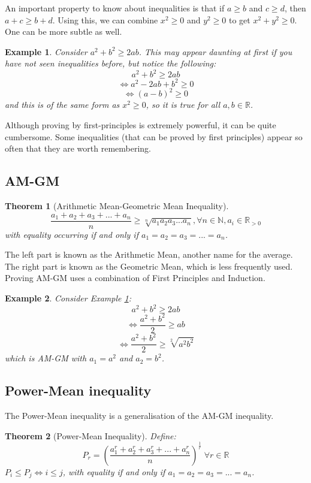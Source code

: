 \documentclass[a4paper,12pt]{article}
\newtheorem{example}{Example}[section]
\newtheorem{theorem}{Theorem}[section]
\begin{document}
An important property to know about inequalities is that if $a \geq b$ and $c \geq d$, then $a + c \geq b + d$. Using this, we can combine $x^2 \geq 0$ and $y^2 \geq 0$ to get $x^2 + y^2 \geq 0$. One can be more subtle as well. 

\begin{example}
    \label{basicfirstprinc}
    Consider $a^2 + b^2 \geq 2ab$. This may appear daunting at first if you have not seen inequalities before, but notice the following:
    $$a^2 + b^2 \geq 2ab$$
    $$\iff a^2 - 2ab + b^2 \geq 0$$
    $$\iff (a - b)^2 \geq 0$$
    and this is of the same form as $x^2 \geq 0$, so it is true for all $a, b \in \mathbb{R}$. \\
\end{example}

Although proving by first-principles is extremely powerful, it can be quite cumbersome. Some inequalities (that can be proved by first principles) appear so often that they are worth remembering.

\subsection{AM-GM}
\begin{theorem}[Arithmetic Mean-Geometric Mean Inequality]
$$\frac{a_1 + a_2 + a_3 + ... + a_n}{n} \geq \sqrt[n]{a_1a_2a_3...a_n}, \forall n \in \mathbb{N}, a_i \in \mathbb{R}_{> 0}$$
with equality occurring if and only if $a_1 = a_2 = a_3 = ... = a_n$.\\
\end{theorem}

The left part is known as the Arithmetic Mean, another name for the average. The right part is known as the Geometric Mean, which is less frequently used. Proving AM-GM uses a combination of First Principles and Induction.

\begin{example}
    Consider Example \ref{basicfirstprinc}:
    $$a^2 + b^2 \geq 2ab$$
$$\iff \frac{a^2 + b^2}{2} \geq ab$$
$$\iff \frac{a^2 + b^2}{2} \geq \sqrt[2]{a^2b^2}$$
which is AM-GM with $a_1 = a^2$ and $a_2 = b^2$.
\end{example}

\subsection{Power-Mean inequality}
The Power-Mean inequality is a generalisation of the AM-GM inequality. 

\begin{theorem}[Power-Mean Inequality]
Define:
$$P_r = (\frac{a_1^r + a_2^r + a_3^r + ... + a_n^r}{n})^{\frac{1}{r}} \; \forall r \in \mathbb{R}$$
$P_i \leq P_j \iff i \leq j$, with equality if and only if $a_1 = a_2 = a_3 = ... = a_n$.
\end{theorem}
\end{document}
